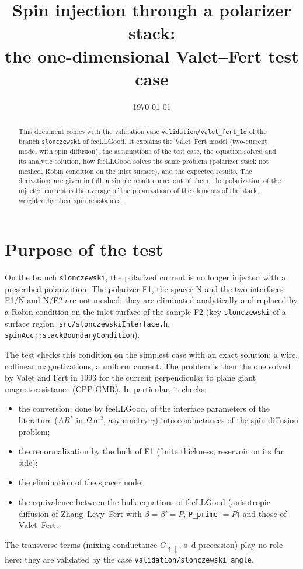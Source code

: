 \documentclass[11pt,a4paper]{article}
\title{Spin injection through a polarizer stack:\\
  the one-dimensional Valet--Fert test case}
\author{}
\date{\today}
\begin{document}
\maketitle

\begin{abstract}
  This document comes with the validation case
  \texttt{validation/valet\_fert\_1d} of the branch \texttt{slonczewski}
  of feeLLGood. It explains the Valet--Fert model (two-current model with
  spin diffusion), the assumptions of the test case, the equation solved
  and its analytic solution, how feeLLGood solves the same problem
  (polarizer stack not meshed, Robin condition on the inlet surface), and
  the expected results. The derivations are given in full; a simple result
  comes out of them: the polarization of the injected current is the
  average of the polarizations of the elements of the stack, weighted by
  their spin resistances.
\end{abstract}

\tableofcontents

\section{Purpose of the test}

On the branch \texttt{slonczewski}, the polarized current is no longer
injected with a prescribed polarization. The polarizer F1, the spacer N and
the two interfaces F1/N and N/F2 are not meshed: they are eliminated
analytically and replaced by a Robin condition on the inlet surface of the
sample F2 (key \texttt{slonczewski} of a surface region,
\texttt{src/slonczewskiInterface.h},
\texttt{spinAcc::stackBoundaryCondition}).

The test checks this condition on the simplest case with an exact
solution: a wire, collinear magnetizations, a uniform current. The problem
is then the one solved by Valet and Fert in 1993 for the current
perpendicular to plane giant magnetoresistance (CPP-GMR). In particular,
it checks:
\begin{itemize}
  \item the conversion, done by feeLLGood, of the interface parameters of
    the literature ($AR^*$ in $\Omega\,$m$^2$, asymmetry $\gamma$) into
    conductances of the spin diffusion problem;
  \item the renormalization by the bulk of F1 (finite thickness, reservoir
    on its far side);
  \item the elimination of the spacer node;
  \item the equivalence between the bulk equations of feeLLGood
    (anisotropic diffusion of Zhang--Levy--Fert with $\beta=\beta'=P$,
    \texttt{P\_prime} $=P$) and
    those of Valet--Fert.
\end{itemize}
The transverse terms (mixing conductance $G_{\uparrow\downarrow}$, s--d
precession) play no role here: they are validated by the case
\texttt{validation/slonczewski\_angle}.
\end{document}
